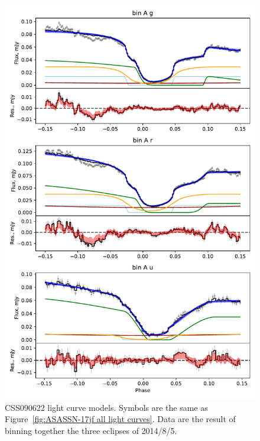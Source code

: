 %     

\begin{figure}
    \centering
    \includegraphics[width=\textwidth]{figures/results/CSS090622/CSS090622_1.pdf}
    \caption{CSS090622 light curve models. Symbols are the same as Figure~\ref{fig:ASASSN-17jf all light curves}. Data are the result of binning together the three eclipses of 2014/8/5.}
    \label{fig:CSS090622 all light curves}
\end{figure}
